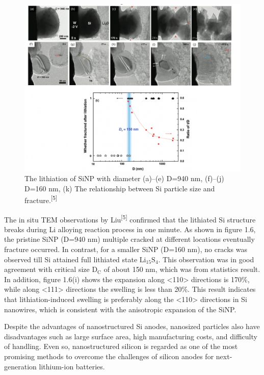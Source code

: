 \begin{figure}[H]
\centering
\includegraphics[width=14cm]{src/fig/fig6.png}
\caption{The lithiation of SiNP with diameter (a)--(e) D=940 nm, (f)--(j) D=160 nm, (k) The relationship between Si particle size and fracture.\textsuperscript{[5]}}
\end{figure}
The in situ TEM observations by Liu\textsuperscript{[5]} confirmed that the lithiated Si structure breaks during Li alloying reaction process in one minute. As shown in figure 1.6, the pristine SiNP (D=940 nm) multiple cracked at different locations eventually fracture occurred. In contrast, for a smaller SiNP (D=160 nm), no cracks was observed till Si attained full lithiated state $\mathrm{Li_{15}S_{4}}$. This observation was in good agreement with critical size $\mathrm{D_{C}}$ of about 150 nm, which was from statistics result. 
In addition, figure 1.6(i) shows the expansion along <110> directions is 170\%, while along <111> directions the swelling is less than 20\%. This result indicates that lithiation-induced swelling is preferably along the <110> directions in Si nanowires, which is consistent with the anisotropic expansion of the SiNP.

Despite the advantages of nanostructured Si anodes, nanosized particles also have disadvantages such as large surface area, high manufacturing costs, and difficulty of handling. Even so, nanostructured silicon is regarded as one of the most promising methods to overcome the challenges of silicon anodes for next-generation lithium-ion batteries.
